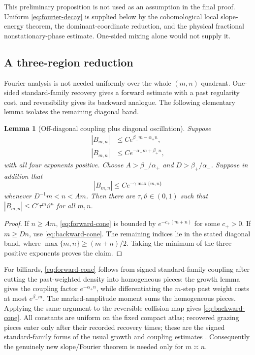 \documentclass[11pt]{article}
\newtheorem{lemma}[theorem]{Lemma}
\begin{document}
This preliminary proposition is not used as an assumption in the final proof.
Uniform \eqref{eq:fourier-decay} is supplied below by the cohomological
local slope-energy theorem, the dominant-coordinate reduction, and the
physical fractional nonstationary-phase estimate.  One-sided mixing alone
would not supply it.

\subsection{A three-region reduction}

Fourier analysis is not needed uniformly over the whole $(m,n)$ quadrant.
One-sided standard-family recovery gives a forward estimate with a past
regularity cost, and reversibility gives its backward analogue.  The following
elementary lemma isolates the remaining diagonal band.

\begin{lemma}[Off-diagonal coupling plus diagonal oscillation]
\label{lem:three-region}
Suppose
\begin{align}
 |B_{m,n}|&\le C e^{\beta_-m-\alpha_+n},\label{eq:forward-cone}\\
 |B_{m,n}|&\le C e^{-\alpha_-m+\beta_+n},\label{eq:backward-cone}
\end{align}
with all four exponents positive.  Choose
$A>\beta_-/\alpha_+$ and $D>\beta_+/\alpha_-$.  Suppose in addition that
\[
 |B_{m,n}|\le Ce^{-\gamma\max\{m,n\}}
\]
whenever $D^{-1}m<n<Am$.  Then there are
$\tau,\vartheta\in(0,1)$ such that
$|B_{m,n}|\le C'\tau^m\vartheta^n$ for all $m,n$.
\end{lemma}

\begin{proof}
If $n\ge Am$, \eqref{eq:forward-cone} is bounded by
$e^{-c_+(m+n)}$ for some $c_+>0$.  If $m\ge Dn$, use
\eqref{eq:backward-cone}.  The remaining indices lie in the stated diagonal
band, where $\max\{m,n\}\ge(m+n)/2$.  Taking the minimum of the three positive
exponents proves the claim.
\end{proof}

For billiards, \eqref{eq:forward-cone} follows from signed
standard-family coupling after cutting the past-weighted density into
homogeneous pieces: the growth lemma gives the coupling factor
$e^{-\alpha_+n}$, while differentiating the $m$-step past weight costs at
most $e^{\beta_-m}$.  The marked-amplitude moment sums the homogeneous
pieces.  Applying the same argument to the reversible collision map gives
\eqref{eq:backward-cone}.  All constants are uniform on the fixed compact
atlas; recovered grazing pieces enter only after their recorded recovery
times; these are the signed standard-family forms of the usual growth and
coupling estimates \cite{Chernov1999,DLreview}.
Consequently the genuinely new slope/Fourier theorem is needed only for
$m\asymp n$.
\end{document}
